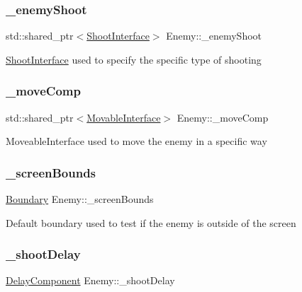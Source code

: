 \subsubsection{\texorpdfstring{\+\_\+enemy\+Shoot}{\_enemyShoot}}
{\footnotesize\ttfamily std\+::shared\+\_\+ptr$<$\hyperlink{class_shoot_interface}{Shoot\+Interface}$>$ Enemy\+::\+\_\+enemy\+Shoot\hspace{0.3cm}{\ttfamily [private]}}

\hyperlink{class_shoot_interface}{Shoot\+Interface} used to specify the specific type of shooting \mbox{\label{class_enemy_a1776f87f0a6993e9e3255c8a41c73809}} 
\subsubsection{\texorpdfstring{\+\_\+move\+Comp}{\_moveComp}}
{\footnotesize\ttfamily std\+::shared\+\_\+ptr$<$\hyperlink{class_movable_interface}{Movable\+Interface}$>$ Enemy\+::\+\_\+move\+Comp\hspace{0.3cm}{\ttfamily [private]}}

Moveable\+Interface used to move the enemy in a specific way \mbox{\label{class_enemy_afb32f85ca2f3dce003e62a91572bdb70}} 
\subsubsection{\texorpdfstring{\+\_\+screen\+Bounds}{\_screenBounds}}
{\footnotesize\ttfamily \hyperlink{class_boundary}{Boundary} Enemy\+::\+\_\+screen\+Bounds\hspace{0.3cm}{\ttfamily [private]}}

Default boundary used to test if the enemy is outside of the screen \mbox{\label{class_enemy_a3c5bc99471cfa718af8e11b3b735d15c}} 
\subsubsection{\texorpdfstring{\+\_\+shoot\+Delay}{\_shootDelay}}
{\footnotesize\ttfamily \hyperlink{class_delay_component}{Delay\+Component} Enemy\+::\+\_\+shoot\+Delay\hspace{0.3cm}{\ttfamily [private]}}


